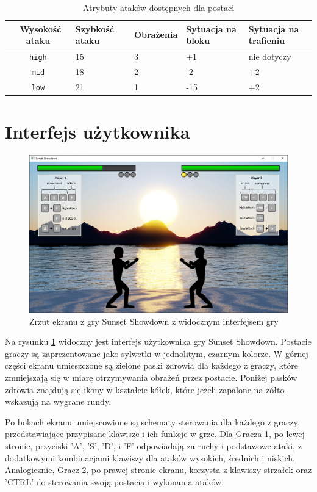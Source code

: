 \begin{table}[htb] \small
\centering
\caption{Atrybuty ataków dostępnych dla postaci}
\label{tab:ataki}
\begin{tabularx}{\linewidth}{|c|X|X|X|X|} \hline\
Wysokość ataku & Szybkość ataku & Obrażenia & Sytuacja na bloku & Sytuacja na trafieniu \\ \hline\hline
\texttt{high} & 15 & 3 & +1 & nie dotyczy \\ \hline
\texttt{mid} & 18 & 2 & -2 & +2\\ \hline
\texttt{low} & 21 & 1 & -15 & +2\\ \hline
\end{tabularx}
\end{table}

\section{Interfejs użytkownika}
\begin{figure}
	\centering
		\includegraphics[width=0.64\linewidth]{rys02/interfejs}
	\caption{Zrzut ekranu z gry Sunset Showdown z widocznym interfejsem gry}
	\label{fig:interfejs}
\end{figure}
Na rysunku \ref{fig:interfejs} widoczny jest interfejs użytkownika gry Sunset Showdown. Postacie graczy są zaprezentowane jako sylwetki w jednolitym, czarnym kolorze. W górnej części ekranu umieszczone są zielone paski zdrowia dla każdego z graczy, które zmniejszają się w miarę otrzymywania obrażeń przez postacie. Poniżej pasków zdrowia znajdują się ikony w kształcie kółek, które jeżeli zapalone na żółto wskazują na wygrane rundy.

Po bokach ekranu umiejscowione są schematy sterowania dla każdego z graczy, przedstawiające przypisane klawisze i ich funkcje w grze. Dla Gracza 1, po lewej stronie, przyciski 'A', 'S', 'D', i 'F' odpowiadają za ruchy i podstawowe ataki, z dodatkowymi kombinacjami klawiszy dla ataków wysokich, średnich i niskich. Analogicznie, Gracz 2, po prawej stronie ekranu, korzysta z klawiszy strzałek oraz 'CTRL' do sterowania swoją postacią i wykonania ataków.


